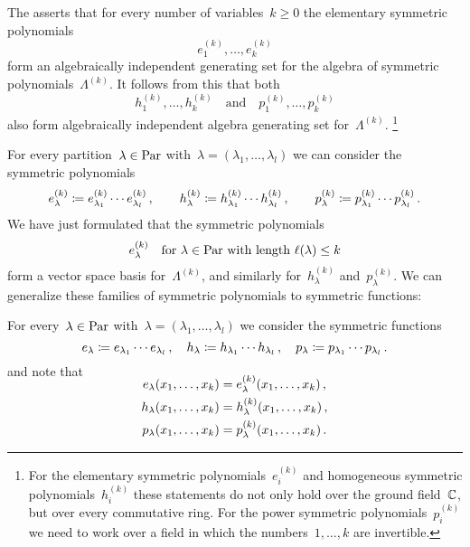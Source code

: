 \documentclass[a4paper,11pt]{scrartcl}
\begin{document}
The  asserts that for every number of variables~$k \geq 0$ the elementary symmetric polynomials
\[
  e^{(k)}_1, \dotsc, e^{(k)}_k
\]
form an algebraically independent generating set for the algebra of symmetric polynomials~$\Lambda^{(k)}$.
It follows from this that both
\[
  h^{(k)}_1, \dotsc, h^{(k)}_k
  \quad\text{and}\quad
  p^{(k)}_1, \dotsc, p^{(k)}_k
\]
also form algebraically independent algebra generating set for~$\Lambda^{(k)}$.%
\footnote{
  For the elementary symmetric polynomials~$e^{(k)}_i$ and homogeneous symmetric polynomials~$h^{(k)}_i$ these statements do not only hold over the ground field~$\mathbb{C}$, but over every commutative ring.
  For the power symmetric polynomials~$p^{(k)}_i$ we need to work over a field in which the numbers~$1, \dotsc, k$ are invertible.
}

For every partition~$\lambda \in \mathrm{Par}$ with~$\lambda = (\lambda_1, \dotsc, \lambda_l)$ we can consider the symmetric polynomials
\[
  e^{(k)}_\lambda
  \coloneqq
  e^{(k)}_{\lambda_1} \dotsm e^{(k)}_{\lambda_l} \,,
  \qquad
  h^{(k)}_\lambda
  \coloneqq
  h^{(k)}_{\lambda_1} \dotsm h^{(k)}_{\lambda_l} \,,
  \qquad
  p^{(k)}_\lambda
  \coloneqq
  p^{(k)}_{\lambda_1} \dotsm p^{(k)}_{\lambda_l} \,.
\]
We have just formulated that the symmetric polynomials
\[
  e^{(k)}_\lambda
  \quad
  \text{for $\lambda \in \mathrm{Par}$ with length~$\ell(\lambda) \leq k$}
\]
form a vector space basis for~$\Lambda^{(k)}$, and similarly for~$h^{(k)}_\lambda$ and~$p^{(k)}_\lambda$.
We can generalize these families of symmetric polynomials to symmetric functions:

\begin{example}
  For every~$\lambda \in \mathrm{Par}$ with~$\lambda = (\lambda_1, \dotsc, \lambda_l)$ we consider the symmetric functions
  \[
    e_\lambda
    \coloneqq
    e_{\lambda_1} \dotsm e_{\lambda_l} \,,
    \quad
    h_\lambda
    \coloneqq
    h_{\lambda_1} \dotsm h_{\lambda_l} \,,
    \quad
    p_\lambda
    \coloneqq
    p_{\lambda_1} \dotsm p_{\lambda_l} \,.
  \]
  and note that
  \begin{align*}
    \SwapAboveDisplaySkip
    e_\lambda(x_1, \dotsc, x_k)
    &=
    e^{(k)}_\lambda(x_1, \dotsc, x_k) \,,
    \\
    h_\lambda(x_1, \dotsc, x_k)
    &=
    h^{(k)}_\lambda(x_1, \dotsc, x_k) \,,
    \\
    p_\lambda(x_1, \dotsc, x_k)
    &=
    p^{(k)}_\lambda(x_1, \dotsc, x_k) \,.
  \end{align*}
\end{example}
\end{document}
